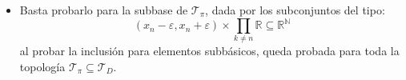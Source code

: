 \begin{dem}
\begin{itemize}
Para $n > N$, se tiene $\dfrac{\overline{d}(x_n, y_n)}{n} \le \dfrac{1}{n} < \dfrac{1}{N} < \varepsilon$. 

Por consiguiente, $D(x,y) = \sup_{n \ge 1} \left\{ \frac{\overline{d}(x_n, y_n)}{n} \right\} < \varepsilon \Rightarrow y \in B_D(x, \varepsilon)$, lo que demuestra que $U \subseteq B_D(x, \varepsilon)$.

\item[$\boxed{\subseteq}$] Basta probarlo para la subbase de $\mathcal{T}_\pi$, dada por los subconjuntos del tipo:
\[
(x_n - \varepsilon, x_n + \varepsilon) \times \prod_{k \neq n} \mathbb{R} \subseteq \mathbb{R}^\mathbb{N}
\]
al probar la inclusión para elementos subbásicos, queda probada para toda la topología $\mathcal{T}_\pi \subseteq \mathcal{T}_D$. 
\end{itemize}
\end{dem}
